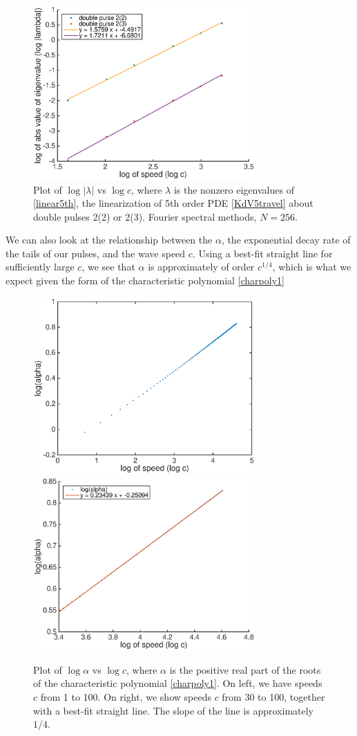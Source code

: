 \documentclass[12pt]{article}
\begin{document}
\begin{figure}[H]
	\includegraphics[width=8.5cm]{eigvsspeed}
	\caption{Plot of $\log{|\lambda|}$ vs $\log{c}$, where $\lambda$ is the nonzero eigenvalues of \eqref{linear5th}, the linearization of 5th order PDE \eqref{KdV5travel} about double pulses 2(2) or 2(3). Fourier spectral methods, $N = 256$.}
	\label{eigvsspeed}
\end{figure}

We can also look at the relationship between the $\alpha$, the exponential decay rate of the tails of our pulses, and the wave speed $c$. Using a best-fit straight line for sufficiently large $c$, we see that $\alpha$ is approximately of order $c^{1/4}$, which is what we expect given the form of the characteristic polynomial \eqref{charpoly1}

\begin{figure}[H]
	\includegraphics[width=8.5cm]{alphavsc.eps}
	\includegraphics[width=8.5cm]{alphavsczoom}
	\caption{Plot of $\log{\alpha}$ vs $\log{c}$, where $\alpha$ is the positive real part of the roots of the characteristic polynomial \eqref{charpoly1}. On left, we have speeds $c$ from 1 to 100. On right, we show speeds $c$ from 30 to 100, together with a best-fit straight line. The slope of the line is approximately $1/4$.}
	\label{alphavsc}
\end{figure}
\end{document}
